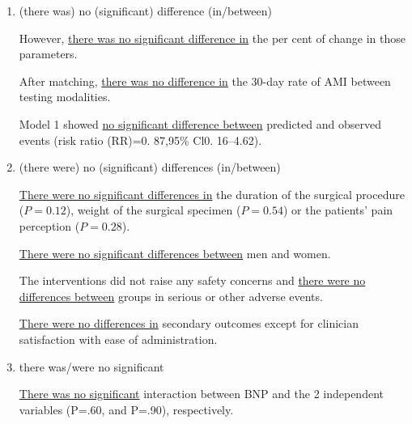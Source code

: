 \documentclass[a4paper]{ctexbook}
\begin{document}
    \begin{enumerate}
      \item (there was) no (significant) difference (in/between)
      \begin{eg}{}
        However, \uline{there was no significant difference in} the per cent of change in those parameters. 
      \end{eg}

      \begin{eg}{}
        After matching, \uline{there was no difference in} the 30-day rate of AMI between testing modalities.  
      \end{eg}

      \begin{eg}{}
        Model 1 showed \uline{no significant difference between} predicted and observed events (risk ratio (RR)=0. 87,95\% Cl0. 16--4.62).
      \end{eg}

      \item (there were) no (significant) differences (in/between)
      \begin{eg}{}
        \uline{There were no significant differences in} the duration of the surgical procedure ($P=0.12$), weight of the surgical specimen ($P=0.54$) or the patients' pain perception ($P=0.28$).
      \end{eg}

      \begin{eg}{}
        \uline{There were no significant differences between} men and women. 
      \end{eg}

      \begin{eg}{}
        The interventions did not raise any safety concerns and \uline{there were no differences between} groups in serious or other adverse events.  
      \end{eg}

      \begin{eg}{}
        \uline{There were no differences in} secondary outcomes except for clinician satisfaction with ease of administration.
      \end{eg}

      \item there was/were no significant
      \begin{eg}{}
        \uline{There was no significant} interaction between BNP and the 2 independent variables (P=.60, and P=.90), respectively.        
      \end{eg}


\end{enumerate}
\end{document}
